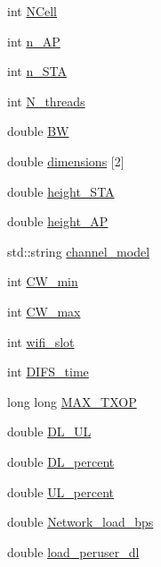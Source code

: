 \begin{DoxyCompactItemize}
\item 
int \hyperlink{structparameters_a220e9746ed9ebf49edc95c78721a245e}{N\-Cell}
\item 
int \hyperlink{structparameters_aa2b1067022fb06903d7529ea0af5d45f}{n\-\_\-\-A\-P}
\item 
int \hyperlink{structparameters_aa28e7a8ab695a9bf3056dc05d5cb916d}{n\-\_\-\-S\-T\-A}
\item 
int \hyperlink{structparameters_a4c664752b1a78fe7f2cd8c5bb3b9e3a1}{N\-\_\-threads}
\item 
double \hyperlink{structparameters_ac5f5238606e728cd1d01a08113e36829}{B\-W}
\item 
double \hyperlink{structparameters_a67043e8064b2352cadfb685b1f39f66b}{dimensions} \mbox{[}2\mbox{]}
\item 
double \hyperlink{structparameters_a0799b0f364ad0fe773fdec62407144f4}{height\-\_\-\-S\-T\-A}
\item 
double \hyperlink{structparameters_aeba51b77bd7d93edf7ec54d444a76e5e}{height\-\_\-\-A\-P}
\item 
std\-::string \hyperlink{structparameters_a16dba3ff81522c5acf14750929b461fc}{channel\-\_\-model}
\item 
int \hyperlink{structparameters_a80db9f2709f397239e827974d9c6deaa}{C\-W\-\_\-min}
\item 
int \hyperlink{structparameters_a7716151437acba90b37a7de2088da9da}{C\-W\-\_\-max}
\item 
int \hyperlink{structparameters_a771941f653f52f2c398deae9f44e82d5}{wifi\-\_\-slot}
\item 
int \hyperlink{structparameters_adca3efd3a896aefccc975ebb57e71423}{D\-I\-F\-S\-\_\-time}
\item 
long long \hyperlink{structparameters_ae7178f23f8bef3a2a715f63bfe0dd485}{M\-A\-X\-\_\-\-T\-X\-O\-P}
\item 
double \hyperlink{structparameters_a0d389ff55ad4464ab764f04a551fa394}{D\-L\-\_\-\-U\-L}
\item 
double \hyperlink{structparameters_aedef612155015dc5d8dad50414bac5ac}{D\-L\-\_\-percent}
\item 
double \hyperlink{structparameters_ad4364f715b9733da85943ab6bd565668}{U\-L\-\_\-percent}
\item 
double \hyperlink{structparameters_ab7a40818f657353275b8049574bf3b0d}{Network\-\_\-load\-\_\-bps}
\item 
double \hyperlink{structparameters_a4785fc49f0e3c305f6a10a42fc660f01}{load\-\_\-peruser\-\_\-dl}

\end{DoxyCompactItemize}

